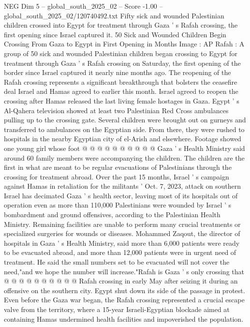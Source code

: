 \begin{textsample}{NEG Dim 5 – global\_south\_2025\_02 – Score -1.00 – global\_south\_2025\_02/120740492.txt}  \label{ex:f5_neg_301}
Fifty sick and wounded Palestinian children crossed into Egypt for treatment through Gaza ' s Rafah crossing, the first opening since Israel captured it. 50 Sick and Wounded Children Begin Crossing From Gaza to Egypt in First Opening in Months Image : AP Rafah : A group of 50 sick and wounded Palestinian children began crossing to Egypt for treatment through Gaza ' s Rafah crossing on Saturday, the first opening of the border since Israel captured it nearly nine months ago.
The reopening of the Rafah crossing represents a significant breakthrough that bolsters the ceasefire deal Israel and Hamas agreed to earlier this month.
Israel agreed to reopen the crossing after Hamas released the last living female hostages in Gaza.
Egypt ' s Al-Qahera television showed at least two Palestinian Red Cross ambulances pulling up to the crossing gate.
Several children were brought out on gurneys and transferred to ambulances on the Egyptian side.
From there, they were rushed to hospitals in the nearby Egyptian city of el-Arish and elsewhere.
Footage showed one young girl whose foot @ @ @ @ @ @ @ @ @ @ Gaza ' s Health Ministry said around 60 family members were accompanying the children.
The children are the first in what are meant to be regular evacuations of Palestinians through the crossing for treatment abroad.
Over the past 15 months, Israel ' s campaign against Hamas in retaliation for the militants ' Oct. 7, 2023, attack on southern Israel has decimated Gaza ' s health sector, leaving most of its hospitals out of operation even as more than 110,000 Palestinians were wounded by Israel ' s bombardment and ground offensives, according to the Palestinian Health Ministry.
Remaining facilities are unable to perform many crucial treatments or specialized surgeries for wounds or diseases.
Mohammed Zaqout, the director of hospitals in Gaza ' s Health Ministry, said more than 6,000 patients were ready to be evacuated abroad, and more than 12,000 patients were in urgent need of treatment.
He said the small numbers set to be evacuated will not cover the need,"and we hope the number will increase."Rafah is Gaza ' s only crossing that @ @ @ @ @ @ @ @ @ @ Rafah crossing in early May after seizing it during an offensive on the southern city.
Egypt shut down its side of the passage in protest.
Even before the Gaza war began, the Rafah crossing represented a crucial escape valve from the territory, where a 15-year Israeli-Egyptian blockade aimed at containing Hamas undermined health facilities and impoverished the population.

\end{textsample}
